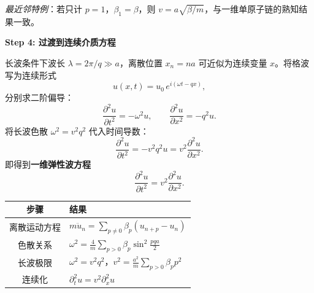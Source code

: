 \begin{derivationbox}[标准解题过程]
\textit{最近邻特例}：若只计 $p=1$，$\beta_1=\beta$，则 $v=a\sqrt{\beta/m}$，与一维单原子链的熟知结果一致。

\textbf{Step 4: 过渡到连续介质方程}

长波条件下波长 $\lambda=2\pi/q\gg a$，离散位置 $x_n=na$ 可近似为连续变量 $x$。将格波写为连续形式
\begin{equation}
u(x,t) = u_0\,e^{i(\omega t-qx)},
\end{equation}
分别求二阶偏导：
\begin{equation}
\frac{\partial^2 u}{\partial t^2} = -\omega^2 u, \qquad \frac{\partial^2 u}{\partial x^2} = -q^2 u.
\end{equation}
将长波色散 $\omega^2=v^2q^2$ 代入时间导数：
\begin{equation}
\frac{\partial^2 u}{\partial t^2} = -v^2q^2 u = v^2\frac{\partial^2 u}{\partial x^2}.
\end{equation}
即得到\textbf{一维弹性波方程}
\begin{equation}
\boxed{\frac{\partial^2 u}{\partial t^2} = v^2\frac{\partial^2 u}{\partial x^2}.}
\end{equation}
\end{derivationbox}

\begin{formulabox}[核心公式链]
\begin{center}
\begin{tabular}{cl}
\toprule
步骤 & 结果 \\
\midrule
离散运动方程 & $\displaystyle m\ddot u_n = \sum_{p\neq0}\beta_p(u_{n+p}-u_n)$ \\[8pt]
色散关系 & $\displaystyle \omega^2 = \frac{4}{m}\sum_{p>0}\beta_p\sin^2\frac{pqa}{2}$ \\[8pt]
长波极限 & $\displaystyle \omega^2 = v^2 q^2$，$\displaystyle v^2=\frac{a^2}{m}\sum_{p>0}\beta_p p^2$ \\[8pt]
连续化 & $\displaystyle \partial_t^2 u = v^2\partial_x^2 u$ \\
\bottomrule
\end{tabular}
\end{center}
\end{formulabox}

